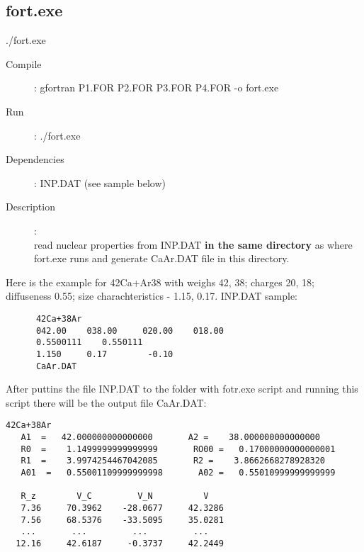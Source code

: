 \documentclass[preprint,review,12pt]{elsarticle}
\begin{document}
  \subsection{fort.exe}
  \label{sec:fort}
    ./fort.exe    %
    \begin{description}
       \item[Compile]:  gfortran P1.FOR P2.FOR P3.FOR P4.FOR -o fort.exe
       \item[Run]: ./fort.exe
       
       \item [Dependencies]:
           \subitem   INP.DAT (see sample below)

       \item [Description]: \\
           read nuclear properties from INP.DAT \textbf{in the same directory} as where fort.exe runs and generate CaAr.DAT file in this directory.
           
    \end{description}
       Here is the example for 42Ca+Ar38 with weighs 42, 38; charges 20, 18; diffuseness 0.55; size charachteristics - 1.15, 0.17.
      INP.DAT sample:
    \begin{verbatim}
      42Ca+38Ar
      042.00    038.00     020.00    018.00
      0.5500111    0.550111
      1.150     0.17        -0.10
      CaAr.DAT
    \end{verbatim}  
    After puttins the file INP.DAT to the folder with fotr.exe script and running this script there will be the output file CaAr.DAT:
    \begin{verbatim}
42Ca+38Ar                                                                       
   A1  =   42.000000000000000       A2 =    38.000000000000000     
   R0  =    1.1499999999999999       RO00 =   0.17000000000000001     
   R1  =    3.9974254467042085       R2 =    3.8662668278928320     
   A01  =   0.55001109999999998       A02 =   0.55010999999999999     

   R_z        V_C         V_N          V
   7.36     70.3962    -28.0677     42.3286
   7.56     68.5376    -33.5095     35.0281
   ...       ...         ...         ...
  12.16     42.6187     -0.3737     42.2449
    \end{verbatim}  
\end{document}
